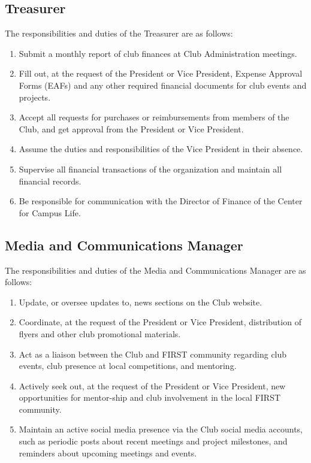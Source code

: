 \documentclass[english,11pt]{article}
\begin{document}
\subsection{Treasurer} \label{sect:cadmin:treasurer}
The responsibilities and duties of the Treasurer are as follows:

\begin{enumerate}[label=\Alph*.]
    \item Submit a monthly report of club finances at Club Administration meetings.
    \item Fill out, at the request of the President or Vice President, Expense Approval Forms (EAFs) and any other required financial documents for club events and projects.
    \item Accept all requests for purchases or reimbursements from members of the Club, and get approval from the President or Vice President.
    \item Assume the duties and responsibilities of the Vice President in their absence.
    \item Supervise all financial transactions of the organization and maintain all financial records.
    \item Be responsible for communication with the Director of Finance of the Center for Campus Life.
\end{enumerate}

\subsection{Media and Communications Manager} \label{sect:cadmin:mediacomms}
The responsibilities and duties of the Media and Communications Manager are as follows:

\begin{enumerate}[label=\Alph*.]
    \item Update, or oversee updates to, news sections on the Club website.
    \item Coordinate, at the request of the President or Vice President, distribution of flyers and other club promotional materials.
    \item Act as a liaison between the Club and FIRST community regarding club events, club presence at local competitions, and mentoring.
    \item Actively seek out, at the request of the President or Vice President, new opportunities for mentor-ship and club involvement in the local FIRST community.
    \item Maintain an active social media presence via the Club social media accounts, such as periodic posts about recent meetings and project milestones, and reminders about upcoming meetings and events.
\end{enumerate}
\end{document}
